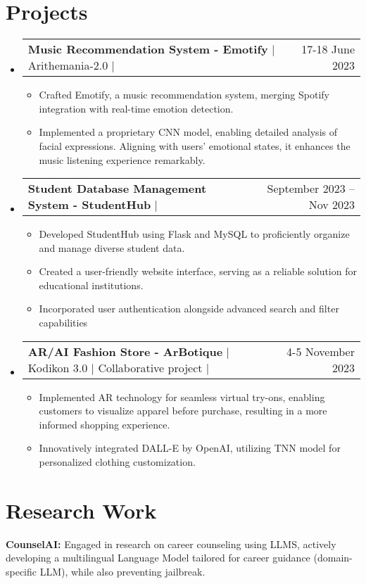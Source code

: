 \documentclass[letterpaper,11pt]{article}
\makeatletter
\newcommand{\resumeItem}[1]{
  \item\small{
    {#1 \vspace{-2pt}}
  }
}
\newcommand{\resumeProjectHeading}[2]{
    \item
    \begin{tabular*}{0.97\textwidth}{l@{\extracolsep{\fill}}r}
      \small#1 & #2 \\
    \end{tabular*}\vspace{-7pt}
}
\newcommand{\resumeSubHeadingListStart}{\begin{itemize}[leftmargin=0.15in, label={}]}
\newcommand{\resumeSubHeadingListEnd}{\end{itemize}}
\newcommand{\resumeItemListStart}{\begin{itemize}}
\newcommand{\resumeItemListEnd}{\end{itemize}\vspace{-5pt}}
\makeatother
\begin{document}
\section{Projects}
    \resumeSubHeadingListStart
        \resumeProjectHeading
        {\textbf{Music Recommendation System - Emotify} $|$ {Arithemania-2.0} $|$ 
        \href{https://github.com/urvashii-b/Emotify}{\color{blue}\faIcon{github}}}{17-18 June 2023}
        \resumeItemListStart
            \resumeItem{Crafted Emotify, a music recommendation system, merging Spotify integration with real-time emotion detection.}
            \resumeItem{Implemented a proprietary CNN model, enabling detailed analysis of facial expressions. Aligning with users' emotional states, it enhances the music listening experience remarkably.}   
        \resumeItemListEnd
        \resumeProjectHeading
        {\textbf{Student Database Management System - StudentHub} $|$ \href{https://github.com/urvashii-b/StudentHub}{\color{blue}\faIcon{github}}}{September 2023 – Nov 2023}
        \resumeItemListStart
            \resumeItem{Developed StudentHub using Flask and MySQL to proficiently organize and manage diverse student data.}
            \resumeItem{Created a user-friendly website interface, serving as a reliable solution for educational institutions.} 
            \resumeItem{Incorporated user authentication alongside advanced search and filter capabilities} 
        \resumeItemListEnd
        \resumeProjectHeading
        {\textbf{AR/AI Fashion Store - ArBotique} $|$ {Kodikon 3.0} $|$ {Collaborative project} $|$ \href{https://github.com/urvashii-b/11_ArBotique}{\color{blue}\faIcon{github}}}
        {4-5 November 2023}
        \resumeItemListStart
            \resumeItem{Implemented AR technology for seamless virtual try-ons, enabling customers to visualize apparel before purchase, resulting in a more informed shopping experience.}
            \resumeItem{Innovatively integrated DALL-E by OpenAI, utilizing TNN model for personalized clothing customization.}     
        \resumeItemListEnd  
    \resumeSubHeadingListEnd

\section{Research Work}
\begin{adjustwidth}{0.15in}{0pt}
    \textbf{CounselAI: }{Engaged in research on career counseling using LLMS, actively developing a multilingual Language Model tailored for career guidance (domain-specific LLM), while also preventing jailbreak.}
\end{adjustwidth}
\end{document}
